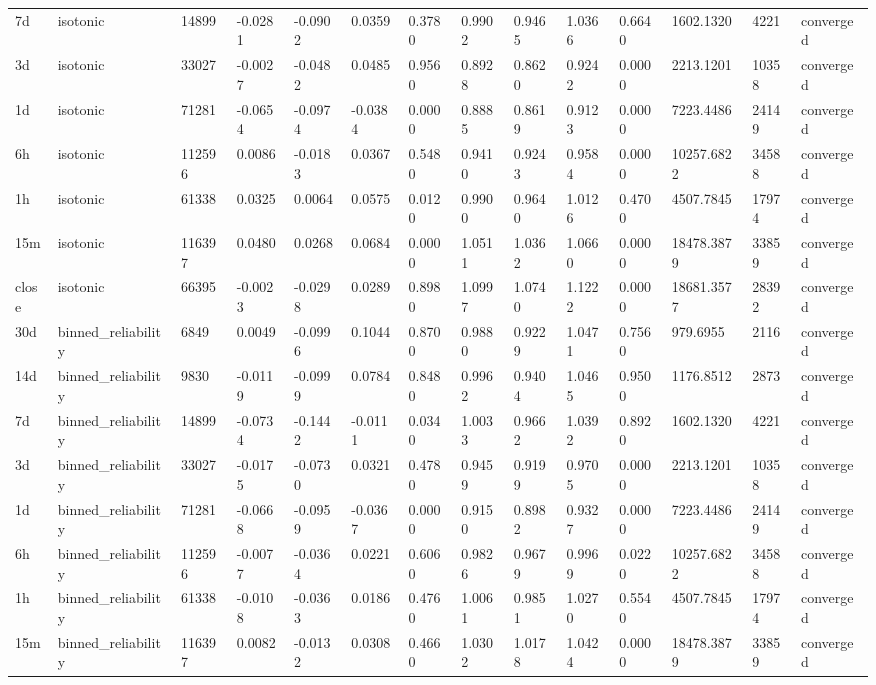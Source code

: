 \begin{tabular}{llllllllllllll}
7d & isotonic & 14899 & -0.0281 & -0.0902 & 0.0359 & 0.3780 & 0.9902 & 0.9465 & 1.0366 & 0.6640 & 1602.1320 & 4221 & converged \\
3d & isotonic & 33027 & -0.0027 & -0.0482 & 0.0485 & 0.9560 & 0.8928 & 0.8620 & 0.9242 & 0.0000 & 2213.1201 & 10358 & converged \\
1d & isotonic & 71281 & -0.0654 & -0.0974 & -0.0384 & 0.0000 & 0.8885 & 0.8619 & 0.9123 & 0.0000 & 7223.4486 & 24149 & converged \\
6h & isotonic & 112596 & 0.0086 & -0.0183 & 0.0367 & 0.5480 & 0.9410 & 0.9243 & 0.9584 & 0.0000 & 10257.6822 & 34588 & converged \\
1h & isotonic & 61338 & 0.0325 & 0.0064 & 0.0575 & 0.0120 & 0.9900 & 0.9640 & 1.0126 & 0.4700 & 4507.7845 & 17974 & converged \\
15m & isotonic & 116397 & 0.0480 & 0.0268 & 0.0684 & 0.0000 & 1.0511 & 1.0362 & 1.0660 & 0.0000 & 18478.3879 & 33859 & converged \\
close & isotonic & 66395 & -0.0023 & -0.0298 & 0.0289 & 0.8980 & 1.0997 & 1.0740 & 1.1222 & 0.0000 & 18681.3577 & 28392 & converged \\
30d & binned\_reliability & 6849 & 0.0049 & -0.0996 & 0.1044 & 0.8700 & 0.9880 & 0.9229 & 1.0471 & 0.7560 & 979.6955 & 2116 & converged \\
14d & binned\_reliability & 9830 & -0.0119 & -0.0999 & 0.0784 & 0.8480 & 0.9962 & 0.9404 & 1.0465 & 0.9500 & 1176.8512 & 2873 & converged \\
7d & binned\_reliability & 14899 & -0.0734 & -0.1442 & -0.0111 & 0.0340 & 1.0033 & 0.9662 & 1.0392 & 0.8920 & 1602.1320 & 4221 & converged \\
3d & binned\_reliability & 33027 & -0.0175 & -0.0730 & 0.0321 & 0.4780 & 0.9459 & 0.9199 & 0.9705 & 0.0000 & 2213.1201 & 10358 & converged \\
1d & binned\_reliability & 71281 & -0.0668 & -0.0959 & -0.0367 & 0.0000 & 0.9150 & 0.8982 & 0.9327 & 0.0000 & 7223.4486 & 24149 & converged \\
6h & binned\_reliability & 112596 & -0.0077 & -0.0364 & 0.0221 & 0.6060 & 0.9826 & 0.9679 & 0.9969 & 0.0220 & 10257.6822 & 34588 & converged \\
1h & binned\_reliability & 61338 & -0.0108 & -0.0363 & 0.0186 & 0.4760 & 1.0061 & 0.9851 & 1.0270 & 0.5540 & 4507.7845 & 17974 & converged \\
15m & binned\_reliability & 116397 & 0.0082 & -0.0132 & 0.0308 & 0.4660 & 1.0302 & 1.0178 & 1.0424 & 0.0000 & 18478.3879 & 33859 & converged \\

\end{tabular}
